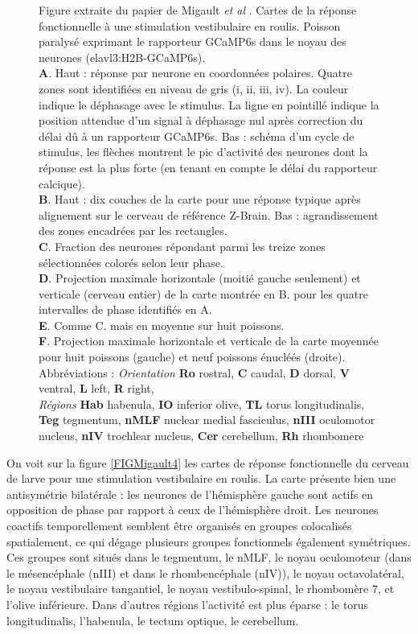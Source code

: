 \addtocounter{figure}{-1}
\begin{figure}
\caption{
Figure extraite du papier de Migault \emph{et al} \cite{migault_whole-brain_2018}. Cartes de la réponse fonctionnelle à une stimulation vestibulaire en roulis. Poisson paralysé exprimant le rapporteur GCaMP6s dans le noyau des neurones (elavl3:H2B-GCaMP6s).
\\\textbf{A}. Haut : réponse par neurone en coordonnées polaires. Quatre zones sont identifiées en niveau de gris (i, ii, iii, iv). La couleur indique le déphasage avec le stimulus. La ligne en pointillé indique la position attendue d'un signal à déphasage nul après correction du délai dû à un rapporteur GCaMP6s. Bas : schéma d'un cycle de stimulus, les flèches montrent le pic d'activité des neurones dont la réponse est la plus forte (en tenant en compte le délai du rapporteur calcique).
\\\textbf{B}. Haut : dix couches de la carte pour une réponse typique après alignement sur le cerveau de référence Z-Brain. Bas : agrandissement des zones encadrées par les rectangles.
\\\textbf{C}. Fraction des neurones répondant parmi les treize zones sélectionnées colorés selon leur phase.
\\\textbf{D}. Projection maximale horizontale (moitié gauche seulement) et verticale (cerveau entier) de la carte montrée en B. pour les quatre intervalles de phase identifiés en A.
\\\textbf{E}. Comme C. mais en moyenne sur huit poissons.
\\\textbf{F}. Projection maximale horizontale et verticale de la carte moyennée pour huit poissons (gauche) et neuf poissons énucléés (droite).
\\Abbréviations : \emph{Orientation} \textbf{Ro} rostral, \textbf{C} caudal, \textbf{D} dorsal, \textbf{V} ventral, \textbf{L} left, \textbf{R} right,
\\\emph{Régions}  \textbf{Hab} habenula, \textbf{IO} inferior olive, \textbf{TL} torus longitudinalis, \textbf{Teg} tegmentum, \textbf{nMLF} nuclear medial fasciculus, \textbf{nIII} oculomotor nucleus, \textbf{nIV} trochlear nucleus, \textbf{Cer} cerebellum, \textbf{Rh} rhombomere
}
\end{figure}

On voit sur la figure \ref{FIGMigault4} les cartes de réponse fonctionnelle du cerveau de larve pour une stimulation vestibulaire en roulis. La carte présente bien une antisymétrie bilatérale : les neurones de l'hémisphère gauche sont actifs en opposition de phase par rapport à ceux de l'hémisphère droit. Les neurones coactifs temporellement semblent être organisés en groupes colocalisés spatialement, ce qui dégage plusieurs groupes fonctionnels également symétriques.
Ces groupes sont situés dans le tegmentum, le nMLF, le noyau oculomoteur (dans le mésencéphale (nIII) et dans le rhombencéphale (nIV)), le noyau octavolatéral, le noyau vestibulaire tangantiel, le noyau vestibulo-spinal, le rhombomère 7, et l'olive inférieure. Dans d'autres régions l'activité est plus éparse : le torus longitudinalis, l'habenula, le tectum optique, le cerebellum.

